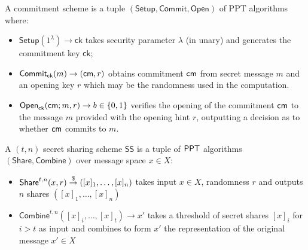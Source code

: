 \begin{definition}
    A commitment scheme is a tuple $(\mathsf{Setup}, \mathsf{Commit}, \mathsf{Open})$ of PPT algorithms where:
    
    \begin{itemize}
        \item $\mathsf{Setup}(1^\lambda) \to \mathsf{ck}$ takes security parameter $\lambda$ (in unary) and generates the commitment key $\mathsf{ck}$;
        
        \item $\mathsf{Commit}_{\mathsf{ck}}(m) \to (\mathsf{cm}, r)$ obtains commitment $\mathsf{cm}$ from secret message $m$ and an opening key $r$ which may be the randomness used in the computation.
        
        \item $\mathsf{Open}_{\mathsf{ck}}(\mathsf{cm}; m, r) \to b \in \{0, 1\}$ verifies the opening of the commitment $\mathsf{cm}$ to the message $m$ provided with the opening hint $r$, outputting a decision as to whether $\mathsf{cm}$ commits to $m$. 
    \end{itemize}
\end{definition}

\begin{definition}
    A $(t,n)$ secret sharing scheme $\mathsf{SS}$ is a tuple of $\mathsf{PPT}$ algorithms $(\mathsf{Share}, \mathsf{Combine})$ over message space $x \in X$:
    \begin{itemize}
        \item $\mathsf{Share}^{t,n}(x, r) \stackrel{\$}{\to} ([x]_1, \dots, [x]_n)$ takes input $x \in X$, randomness $r$ and outputs $n$ shares $([x]_1, \dots, [x]_n)$
        \item $\mathsf{Combine}^{t,n}([x]_i, \dots, [x]_t) \to x'$ takes a threshold of secret shares $[x]_i$ for $i > t$ as input and combines to form $x'$ the representation of the original message $x' \in X$
    \end{itemize}
\end{definition}


